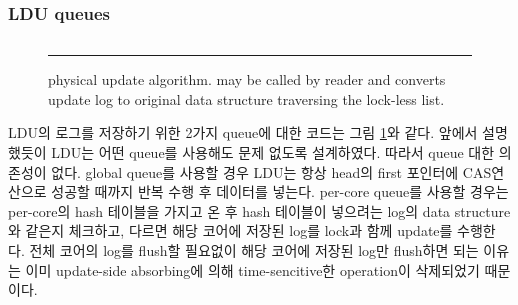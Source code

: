 \ifkorthesis
\subsubsection{LDU queues}
\begin{figure}[tb]
\inputminted[linenos,fontsize=\footnotesize, tabsize=2]{c}{src/ldu_queue.c}
\rule{\columnwidth}{0.5pt}
\vspace{-\baselineskip}
\caption{ physical update algorithm.  may be
 called by reader and converts update log to original data structure
 traversing the lock-less list.}
\label{fig:lduqueue}
\end{figure}

LDU의 로그를 저장하기 위한 2가지 queue에 대한 코드는 그림 \ref{fig:lduqueue}와 같다. 
앞에서 설명했듯이 LDU는 어떤 queue를 사용해도 문제 없도록 설계하였다.
따라서 queue 대한 의존성이 없다.
global queue를 사용할 경우 LDU는 항상 head의 first 포인터에 CAS연산으로 성공할 때까지 반복 수행 후 데이터를 넣는다. 
per-core queue를 사용할 경우는 per-core의 hash 테이블을 가지고 온 후 hash 테이블이 넣으려는 log의
data structure와 같은지 체크하고, 다르면 해당 코어에 저장된 log를 lock과 함께 update를 수행한다.
전체 코어의 log를 flush할 필요없이 해당 코어에 저장된 log만 flush하면 되는 이유는 이미 update-side
absorbing에 의해 time-sencitive한 operation이 삭제되었기 때문이다.
\fi






